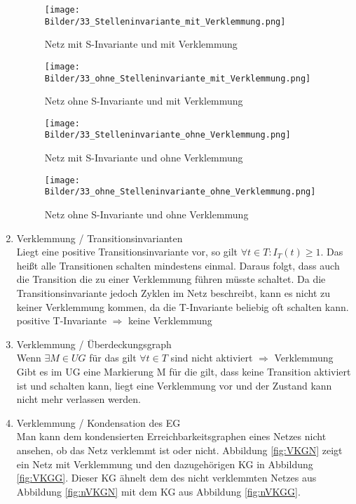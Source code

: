 \documentclass[10pt]{scrartcl}
\begin{document}
\begin{enumerate}
\begin{figure}
\begin{minipage}[hbt]{7cm}
	\centering
	\texttt{[image: Bilder/33\_Stelleninvariante\_mit\_Verklemmung.png]}
	\caption{Netz mit S-Invariante und mit Verklemmung}
	\label{fig:SV}
\end{minipage}
\hfill
\begin{minipage}[hbt]{7cm}
	\centering
	\texttt{[image: Bilder/33\_ohne\_Stelleninvariante\_mit\_Verklemmung.png]}
	\caption{Netz ohne S-Invariante und mit Verklemmung}
	\label{fig:oSV}
\end{minipage}
\end{figure}
\begin{figure}
\begin{minipage}[hbt]{7cm}
	\centering
	\texttt{[image: Bilder/33\_Stelleninvariante\_ohne\_Verklemmung.png]}
	\caption{Netz mit S-Invariante und ohne Verklemmung}
	\label{fig:SoV}
\end{minipage}
\hfill
\begin{minipage}[hbt]{7cm}
	\centering
	\texttt{[image: Bilder/33\_ohne\_Stelleninvariante\_ohne\_Verklemmung.png]}
	\caption{Netz ohne S-Invariante und ohne Verklemmung}
	\label{fig:oSoV}
\end{minipage}
\end{figure}

\item{Verklemmung / Transitionsinvarianten}\\
Liegt eine positive Transitionsinvariante vor, so gilt $\forall t \in T : I_{T}(t)\geq1$. Das heißt alle Transitionen schalten mindestens einmal. Daraus folgt, dass auch die Transition die zu einer Verklemmung führen müsste schaltet. Da die Transitionsinvariante jedoch Zyklen im Netz beschreibt, kann es nicht zu keiner Verklemmung kommen, da die T-Invariante beliebig oft schalten kann.\\
positive T-Invariante $\Rightarrow$ keine Verklemmung 

\item{Verklemmung / Überdeckungsgraph}\\
Wenn $\exists M \in UG$ für das gilt $\forall t \in T$ sind nicht aktiviert $\Rightarrow$ Verklemmung\\
Gibt es im UG eine Markierung M für die gilt, dass keine Transition aktiviert ist und schalten kann, liegt eine Verklemmung vor und der Zustand kann nicht mehr verlassen werden.

\item{Verklemmung / Kondensation des EG}\\
Man kann dem kondensierten Erreichbarkeitsgraphen eines Netzes nicht ansehen, ob das Netz verklemmt ist oder nicht. Abbildung \ref{fig:VKGN} zeigt ein Netz mit Verklemmung und den dazugehörigen KG in Abbildung \ref{fig:VKGG}. Dieser KG ähnelt dem des nicht verklemmten Netzes aus Abbildung \ref{fig:nVKGN} mit dem KG aus Abbildung \ref{fig:nVKGG}.


\end{enumerate}
\end{document}
